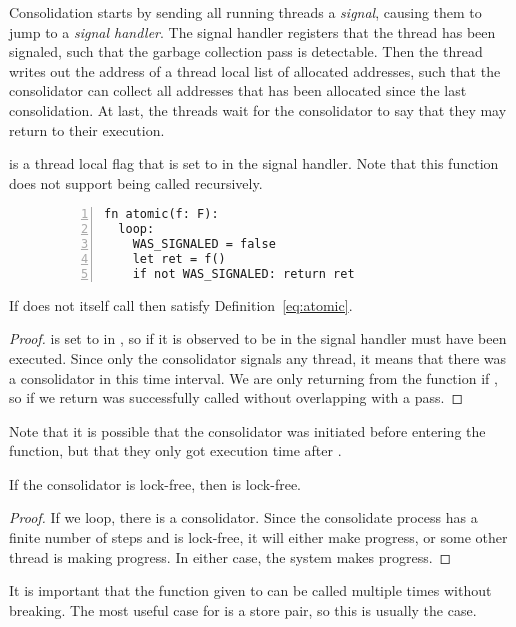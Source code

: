 Consolidation starts by sending all running threads a \emph{signal}, causing them to jump to a
\emph{signal handler}. The signal handler registers that the thread has been signaled, such that the
garbage collection pass is detectable. Then the thread writes out the address of a thread local
list of allocated addresses, such that the consolidator can collect all addresses that has been
allocated since the last consolidation. At last, the threads wait for the consolidator to say that
they may return to their execution. 


   is a thread local flag that is
  set to  in the signal handler. Note that this function does not support being called
  recursively.
\begin{figure}[ht]
  \begin{lstlisting}[numbers=left,numberstyle=\color{gray}\ttfamily{}A,caption=Pseudocode of $atomic$]
fn atomic(f: F):
  loop:
    WAS_SIGNALED = false
    let ret = f()
    if not WAS_SIGNALED: return ret
\end{lstlisting}
\end{figure}

\begin{theorem}
  If  does not itself call  then  satisfy
  Definition~\ref{eq:atomic}.
\end{theorem}
\begin{proof}
   is set to  in , so if it is observed to be
   in  the signal handler must have been executed. Since only the consolidator
  signals any thread, it means that there was a consolidator in this time interval. We are only
  returning from the function if , so if we return  was
  successfully called without overlapping with a pass.
\end{proof}
Note that it is possible that the consolidator was initiated before entering the 
function, but that they only got execution time after .
\begin{lemma}
  If the consolidator is lock-free, then  is lock-free.
\end{lemma}
\begin{proof}
  If we loop, there is a consolidator. Since the consolidate process has a finite number of steps
  and is lock-free, it will either make progress, or some other thread is making progress. In
  either case, the system makes progress.
\end{proof}

It is important that the function given to  can be called multiple times without
breaking. The most useful case for  is a  store pair, so this is
usually the case.
